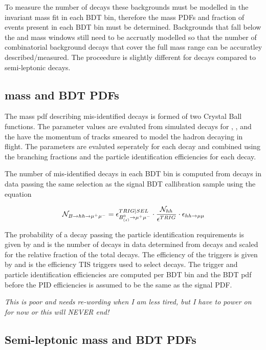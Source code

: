 To measure the number of \bsmumu decays these backgrounds must be modelled  in the invariant mass fit in each BDT bin, therefore the mass PDFs and fraction of events present in each BDT bin must be determined.  Backgrounds that fall below the \bd and \bs mass windows still need to be accruatly modelled so that the number of combinatorial background decays that cover the full mass range can be accuratley described/measured. The proceedure is slightly different for \bhh decays compared to semi-leptonic decays.

\subsection{\bhh mass and BDT PDFs}
The mass pdf describing mis-identified \bhh decays is formed of two Crystal Ball functions. The parameter values are evaluted from simulated decays for \bdkpi, \bskk, \bdpipi and \bsKpi the have the momentum of tracks smeared to model the hadron decaying in flight. The parameters are evaluted seperately for each decay and combined using the branching fractions and the particle identification efficiencies for each decay.

The number of mis-identified \bhh decays in each BDT bin is computed from \bdkpi decays in data passing the same selection as the signal BDT callibration sample using the equation

\begin{equation}
\mathcal{N}_{B \to hh \to \mu^{+} \mu^{-}} = \epsilon^{TRIG|SEL}_{B^{0}_{(s)} \to \mu^{+} \mu^{-}} \cdot \frac{\mathcal{N}_{hh}}{\epsilon^{TRIG}} \cdot \epsilon_{hh\to \mu\mu}  \\
\label{eq:bhhprediction}
\end{equation}

The probability of a \bhh decay passing the \bmumu particle identification requirements is given by  and   is the number of \bhh decays in data determined from \bdkpi decays and scaled for the relative fraction of the total \bhh decays. The efficiency of the \bmumu triggers is given by and  is the efficiency TIS triggers used to select \bdkpi decays. The trigger and particle identification efficiencies are computed per BDT bin and the BDT pdf before the PID efficiencies is assumed to be the same as the signal PDF. 

{\it This is poor and needs re-wording when I am less tired, but I have to power on for now or this will NEVER end!}

\subsection{Semi-leptonic mass and BDT PDFs}

